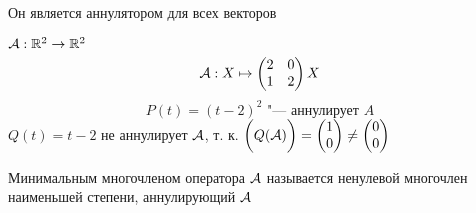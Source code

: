 \begin{remark}
	Он является аннулятором для всех векторов
\end{remark}

\begin{eg}
	$ \mathcal{A} : \mathbb{R}^2 \to \mathbb{R}^2 $
	$$ \mathcal{A} : X \mapsto
	\begin{pmatrix}
		2 & 0 \\
		1 & 2
	\end{pmatrix}X $$
	$$ P(t) = (t - 2)^2 \text{ "--- аннулирует } A $$
	$ Q(t) = t - 2 $ не аннулирует $ \mathcal{A} $, т. к. $ \bigg( Q(\mathcal{A}) \bigg) =
	\begin{pmatrix}
		1 \\
		0
	\end{pmatrix} \ne
	\begin{pmatrix}
		0 \\
		0
	\end{pmatrix} $
\end{eg}

\begin{definition}
	Минимальным многочленом оператора $ \mathcal{A} $ называется ненулевой многочлен наименьшей степени, аннулирующий $ \mathcal{A} $
\end{definition}

